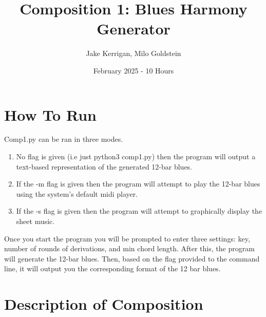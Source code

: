 \documentclass{article}
\title{Composition 1: Blues Harmony Generator}
\author{Jake Kerrigan, Milo Goldstein}
\date{February 2025 - 10 Hours}
\begin{document}
\maketitle

\section{How To Run}

Comp1.py can be ran in three modes. 
\begin{enumerate}
  \item No flag is given (i.e just python3 comp1.py) then the program will output a text-based representation of the generated 12-bar blues.
  \item If the -m flag is given then the program will attempt to play the 12-bar blues using the system's default midi player.
  \item If the -s flag is given then the program will attempt to graphically display the sheet music.
\end{enumerate}

Once you start the program you will be prompted to enter three settings: key, number of rounds of derivations, and min chord length.
After this, the program will generate the 12-bar blues. Then, based on the flag provided to the command line, it will output you the corresponding format of the 12 bar blues. 

\section{Description of Composition}
\end{document}
